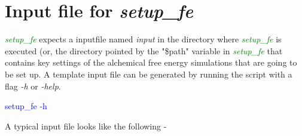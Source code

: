 \documentclass[11pt,letterpaper,titlepage]{article}
\begin{document}
\vspace{0.1cm}
\section{Input file for \textit{setup\_fe}}
\vspace{0.1cm}

\textcolor{green}{\textit{setup\_fe}} expects a inputfile named \textit{input} in the directory 
where \textcolor{green}{\textit{setup\_fe}} is executed (or, the directory pointed by the
"\$path" variable in \textcolor{green}{\textit{setup\_fe}} that contains key settings of the
alchemical free energy simulations that are going to be set up. A template input file can be
generated by running the script with a flag \textit{-h} or \textit{-help}.

\vspace{0.1cm}
\centerline{\textcolor{blue}{setup\_fe -h}}
\vspace{0.1cm}

A typical input file looks like the
following -
\end{document}
